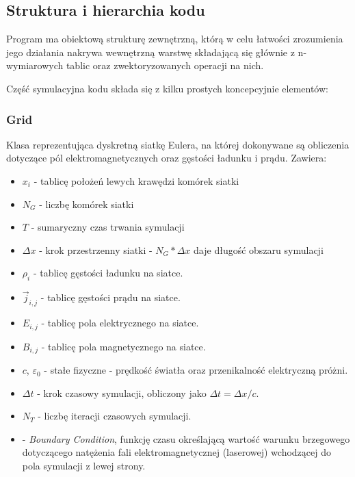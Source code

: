     \subsection{Struktura i hierarchia kodu}

    Program ma obiektową strukturę zewnętrzną, którą w celu łatwości zrozumienia jego działania nakrywa wewnętrzną warstwę
    składającą się głównie z n-wymiarowych tablic  oraz zwektoryzowanych operacji na nich.

    Część symulacyjna kodu składa się z kilku prostych koncepcyjnie elementów:

    \subsubsection{Grid}
    Klasa reprezentująca dyskretną siatkę Eulera, na której dokonywane są obliczenia dotyczące
    pól elektromagnetycznych oraz gęstości ładunku i prądu.
    Zawiera:
    \begin{itemize}
        \item $x_i$ - tablicę położeń lewych krawędzi komórek siatki
        \item $N_G$ - liczbę komórek siatki
        \item $T$ - sumaryczny czas trwania symulacji
        \item $\Delta x$ - krok przestrzenny siatki - $N_G * \Delta x$ daje długość obszaru symulacji
        \item $\rho_i$ - tablicę gęstości ładunku na siatce.
        \item $\vec{j}_{i,j}$ - tablicę gęstości prądu na siatce.
        \item $E_{i,j}$ - tablicę pola elektrycznego na siatce.
        \item $B_{i,j}$ - tablicę pola magnetycznego na siatce.
        \item $c$, $\varepsilon_0$ - stałe fizyczne - prędkość światła oraz przenikalność elektryczną próżni.
        \item $\Delta t$ - krok czasowy symulacji, obliczony jako $\Delta t = \Delta x / c$.
        \item $N_T$ - liczbę iteracji czasowych symulacji.
        \item {} - \emph{Boundary Condition}, funkcję czasu określającą wartość warunku brzegowego dotyczącego
            natężenia fali elektromagnetycznej (laserowej) wchodzącej do pola symulacji z lewej strony.
    \end{itemize}

